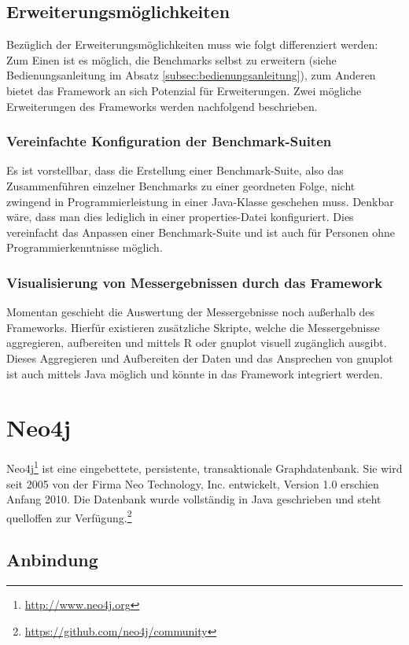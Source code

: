 \documentclass[11pt, a4paper, oneside]{article} %
\begin{document}
\subsection{Erweiterungsmöglichkeiten}

Bezüglich der Erweiterungsmöglichkeiten muss wie folgt differenziert werden: Zum Einen ist es möglich, die Benchmarks selbst zu erweitern (siehe Bedienungsanleitung im Absatz \ref{subsec:bedienungsanleitung}), zum Anderen bietet das Framework an sich Potenzial für Erweiterungen. Zwei mögliche Erweiterungen des Frameworks werden nachfolgend beschrieben.

\subsubsection*{Vereinfachte Konfiguration der Benchmark-Suiten}
Es ist vorstellbar, dass die Erstellung einer Benchmark-Suite, also das Zusammenführen einzelner Benchmarks zu einer geordneten Folge, nicht zwingend in Programmierleistung in einer Java-Klasse geschehen muss. Denkbar wäre, dass man dies lediglich in einer properties-Datei konfiguriert. Dies vereinfacht das Anpassen einer Benchmark-Suite und ist auch für Personen ohne Programmierkenntnisse möglich.

\subsubsection*{Visualisierung von Messergebnissen durch das Framework}
Momentan geschieht die Auswertung der Messergebnisse noch außerhalb des Frameworks. Hierfür existieren zusätzliche Skripte, welche die Messergebnisse aggregieren, aufbereiten und mittels R oder gnuplot visuell zugänglich ausgibt. Dieses Aggregieren und Aufbereiten der Daten und das Ansprechen von gnuplot ist auch mittels Java möglich und könnte in das Framework integriert werden.

\section{Neo4j}

Neo4j\footnote{\url{http://www.neo4j.org}} ist eine eingebettete, persistente, transaktionale Graphdatenbank. Sie wird seit 2005 von der Firma Neo Technology, Inc. entwickelt, Version 1.0 erschien Anfang 2010. Die Datenbank wurde vollständig in Java geschrieben und steht quelloffen zur Verfügung.\footnote{\url{https://github.com/neo4j/community}}

\subsection{Anbindung}
\end{document}
